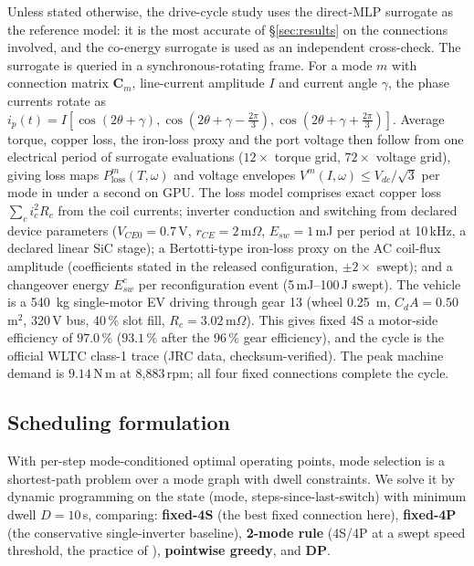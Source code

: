 \documentclass[review]{elsarticle}
\newcommand{\Cmat}{\boldsymbol{C}}
\begin{document}
Unless stated otherwise, the drive-cycle study uses the direct-MLP
surrogate as the reference model: it is the most accurate of
\S\ref{sec:results} on the connections involved, and the co-energy
surrogate is used as an independent cross-check. The surrogate is queried
in a synchronous-rotating frame. For a mode $m$
with connection matrix $\Cmat_m$, line-current amplitude $I$ and current
angle $\gamma$, the phase currents rotate as
$i_p(t)=I[\cos(2\theta+\gamma),\cos(2\theta+\gamma-\tfrac{2\pi}{3}),
\cos(2\theta+\gamma+\tfrac{2\pi}{3})]$. Average torque, copper loss, the
iron-loss proxy and the port voltage then follow from one electrical
period of surrogate evaluations ($12\times$ torque grid, $72\times$
voltage grid), giving loss maps $P_{\text{loss}}^{m}(T,\omega)$ and
voltage envelopes $V^{m}(I,\omega)\le V_{dc}/\sqrt{3}$ per mode in under
a second on GPU. The loss model comprises exact copper loss
$\sum_c i_c^2R_c$ from the coil currents; inverter conduction and
switching from declared device parameters
($V_{CE0}=0.7$\,V, $r_{CE}=2$\,m$\Omega$, $E_{sw}=1$\,mJ per period at
10\,kHz, a declared linear SiC stage); a Bertotti-type
\cite{Bertotti1998} iron-loss proxy on the
AC coil-flux amplitude
(coefficients stated in the released configuration, $\pm2\times$ swept);
and a changeover energy $E_{sw}^{c}$ per reconfiguration event
(5\,mJ--100\,J swept). The vehicle is a \SI{540}{kg} single-motor EV
driving through gear 13 (wheel \SI{0.25}{m}, $C_dA=0.50$\,m$^2$,
320\,V bus, 40\,\% slot fill, $R_c=3.02$\,m$\Omega$). This gives fixed 4S
a motor-side efficiency of $97.0\,\%$ ($93.1\,\%$ after the 96\,\% gear
efficiency), and the cycle is the
official WLTC class-1 trace \cite{UNECE2015} (JRC data,
checksum-verified). The peak machine demand is $9.14$\,N\,m at
8{,}883\,rpm; all four fixed connections complete the cycle.

\subsection{Scheduling formulation}

With per-step mode-conditioned optimal operating points, mode selection is a
shortest-path problem over a mode graph with dwell constraints. We solve it
by dynamic programming on the state (mode, steps-since-last-switch) with
minimum dwell $D=10$\,s, comparing: \textbf{fixed-4S} (the best fixed
connection here), \textbf{fixed-4P} (the conservative single-inverter baseline),
\textbf{2-mode rule} (4S/4P at a swept speed threshold, the practice of
\cite{Shin2024WEVJ}), \textbf{pointwise greedy}, and \textbf{DP}.
\end{document}
